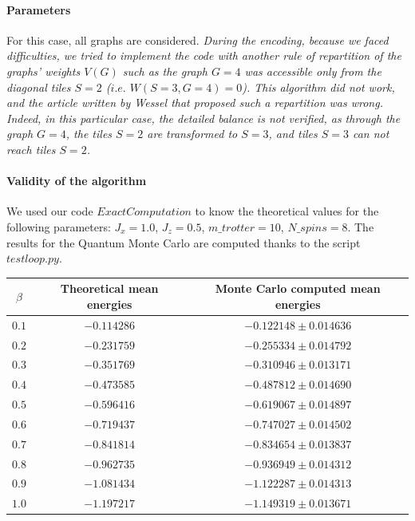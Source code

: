 \documentclass[a4paper,12pt]{article}
\begin{document}
	\paragraph{Parameters} For this case, all graphs are considered.
	\emph{During the encoding, because we faced difficulties, we tried to implement the code with another rule of repartition of the graphs' weights $V(G)$ such as the graph $G = 4$ was accessible only from the diagonal tiles $S = 2$ ($i.e.$ $W(S=3, G=4)=0$). This algorithm did not work, and the article written by Wessel that proposed such a repartition was wrong. Indeed, in this particular case, the detailed balance is not verified, as through the graph $G=4$, the tiles $S=2$ are transformed to $S=3$, and tiles $S=3$ can not reach tiles $S=2$.}
	
	\paragraph{Validity of the algorithm} We used our code $ExactComputation$ to know the theoretical values for the following parameters: $J_x = 1.0$, $J_z = 0.5$,  $m\_trotter = 10$,  $N\_spins = 8$. The results for the Quantum Monte Carlo are computed thanks to the script $testloop.py$. \\
	\begin{tabular}[c]{| c || c | c |}
		\hline            
		$\beta$ & Theoretical mean energies & Monte Carlo computed mean energies \\ \hline
		$0.1$ & $-0.114286$ & $-0.122148 \pm 0.014636$ \\ \hline
		$0.2$ & $-0.231759$ & $-0.255334 \pm 0.014792$ \\ \hline
		$0.3$ & $-0.351769$ & $-0.310946 \pm 0.013171$ \\ \hline
		$0.4$ & $-0.473585$ & $-0.487812 \pm 0.014690$ \\ \hline
		$0.5$ & $-0.596416$ & $-0.619067 \pm 0.014897$ \\ \hline
		$0.6$ & $-0.719437$ & $-0.747027 \pm 0.014502$ \\ \hline
		$0.7$ & $-0.841814$ & $-0.834654 \pm 0.013837$ \\ \hline
		$0.8$ & $-0.962735$ & $-0.936949 \pm 0.014312$ \\ \hline
		$0.9$ & $-1.081434$ & $-1.122287 \pm 0.014313$ \\ \hline
		$1.0$ & $-1.197217$ & $-1.149319 \pm 0.013671$ \\ \hline
	\end{tabular} 
	
\end{document}
